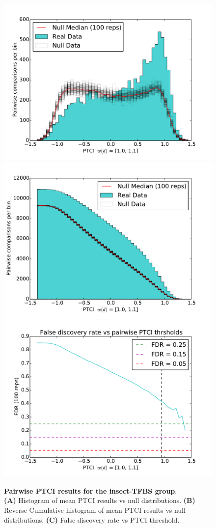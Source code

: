 
\begin{figure}[hp]
%
\subcaptionbox{\label{fig:insect-pair-ptci-hists-base}}
{\includegraphics[width=.5\linewidth]{figures/figs/jaspar_insect_ptci_20130918_orthodb7/pairwise_ptci_hist.pdf}}
% 
\subcaptionbox{\label{fig:insect-pair-ptci-hists-rcum-hist}}
{\includegraphics[width=.5\linewidth]{figures/figs/jaspar_insect_ptci_20130918_orthodb7/pairwise_ptci_cum_hist.pdf}}
% 
\subcaptionbox{\label{fig:insect-pair-ptci-hists-fdr}}
{\includegraphics[width=.5\linewidth]{figures/figs/jaspar_insect_ptci_20130918_orthodb7/pairwise_ptci_fdr.pdf}}
% 
% 
\caption[Pairwise insect-PTCI results]{\sf \textbf{Pairwise PTCI results for the insect-\gls{TFBS} group}:\\
\textbf{(A)} Histogram of mean PTCI results vs null distributions.
\textbf{(B)} Reverse Cumulative histogram of mean PTCI results vs null distributions.
\textbf{(C)} False discovery rate vs PTCI threshold.}
\label{fig:insect-pair-ptci-hists}
\end{figure}